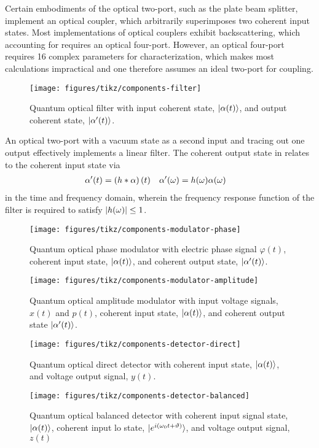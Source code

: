 Certain embodiments of the optical two-port, such as the plate beam splitter, implement an optical coupler, which arbitrarily superimposes two coherent input states.
Most implementations of optical couplers exhibit backscattering, which accounting for requires an optical four-port.
However, an optical four-port requires \num{16} complex parameters for characterization, which makes most calculations impractical and one therefore assumes an ideal two-port for coupling.
\begin{figure}[htb]
    \centering
    \texttt{[image: figures/tikz/components-filter]}
    \caption{Quantum optical filter with input coherent state, $\lvert\alpha(t)\rangle$, and output coherent state, $\lvert\alpha^\prime(t)\rangle$.}\label{fig:components_filter}
\end{figure}
An optical two-port with a vacuum state as a second input and tracing out one output effectively implements a linear filter.
The coherent output state in  relates to the coherent input state via
\begin{align*}
	\alpha^\prime(t)
	&=
	\left(h\ast\alpha\right)(t)
	&
	\alpha^\prime(\omega)
	&=
	h(\omega)
	\alpha(\omega)
\end{align*}
in the time and frequency domain, wherein the frequency response function of the filter is required to satisfy $\lvert h(\omega)\rvert\leq1$.


\begin{figure}[htb]
    \centering
    \texttt{[image: figures/tikz/components-modulator-phase]}
    \caption{Quantum optical phase modulator with electric phase signal $\varphi(t)$, coherent input state, $\lvert\alpha(t)\rangle$, and coherent output state, $\lvert\alpha^\prime(t)\rangle$.}\label{fig:components_modulator_phase}
\end{figure}

\begin{figure}[htb]
    \centering
    \texttt{[image: figures/tikz/components-modulator-amplitude]}
    \caption{Quantum optical amplitude modulator with input voltage signals, $x(t)$ and $p(t)$, coherent input state, $\lvert\alpha(t)\rangle$, and coherent output state $\lvert\alpha^\prime(t)\rangle$.}\label{fig:components_modulator_phase}
\end{figure}


\begin{figure}[htb]
    \centering
    \texttt{[image: figures/tikz/components-detector-direct]}
    \caption{Quantum optical direct detector with coherent input state, $\lvert\alpha(t)\rangle$, and voltage output signal, $y(t)$.}\label{fig:components_detector_direct}
\end{figure}

\begin{figure}[htb]
    \centering
    \texttt{[image: figures/tikz/components-detector-balanced]}
    \caption{Quantum optical balanced detector with coherent input signal state, $\lvert\alpha(t)\rangle$, coherent input \gls{lo} state, $\lvert e^{i(\omega_0t+\vartheta)}\rangle$, and voltage output signal, $z(t)$}\label{fig:components_detector_balanced}
\end{figure}
